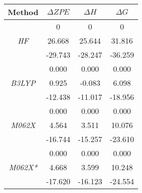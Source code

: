 
\begin{tabular}{|c|c|c|c|}
\hline
\multicolumn{1}{|c|}{\textbf{Method}} & \textbf{$\Delta ZPE$} & \textbf{$\Delta H$} & \textbf{$\Delta G$} \\ \hline
                                      & 0             & 0           & 0           \\ \hline
\multicolumn{1}{|c|}{\textit{HF}}     & 26.668        & 25.644      & 31.816      \\ \hline
                                      & -29.743       & -28.247     & -36.259     \\ \hline
                                      & 0.000         & 0.000       & 0.000       \\ \hline
\multicolumn{1}{|c|}{\textit{B3LYP}}  & 0.925         & -0.083      & 6.098       \\ \hline
                                      & -12.438       & -11.017     & -18.956     \\ \hline
                                      & 0.000         & 0.000       & 0.000       \\ \hline
\multicolumn{1}{|c|}{\textit{M062X}}  & 4.564         & 3.511       & 10.076      \\ \hline
                                      & -16.744       & -15.257     & -23.610     \\ \hline
                                      & 0.000         & 0.000       & 0.000       \\ \hline
\multicolumn{1}{|c|}{\textit{M062X*}} & 4.668         & 3.599       & 10.248      \\ \hline
                                      & -17.620       & -16.123     & -24.554     \\ \hline
\end{tabular}